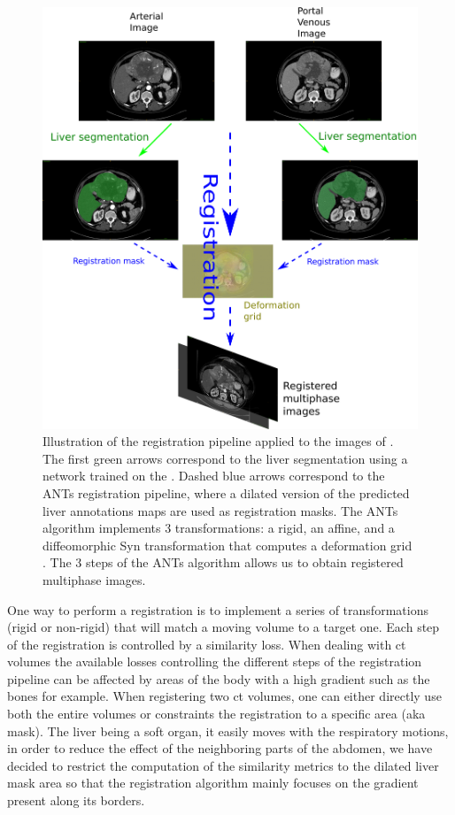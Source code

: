 \begin{figure}[th!]
\centering
\includegraphics[width=0.7\linewidth]{../HistologicalGradePrediction/images/ResizeRegistrationTCIA_pipeline_vertical2}
\caption{Illustration of the registration pipeline applied to the images of \textbf{}. The first green arrows correspond to the liver segmentation using a network trained on the \textbf{}. Dashed blue arrows correspond to the ANTs registration pipeline, where a dilated version of the predicted liver annotations maps are used as registration masks. The ANTs algorithm implements 3 transformations: a rigid, an affine, and a diffeomorphic Syn transformation that computes a deformation grid \cite{Avants2008}. The 3 steps of the ANTs algorithm allows us to obtain registered multiphase images.}
\label{fig:RegistrationTCIA_pipeline_vertical2}
\end{figure}


One way to perform a registration is to implement a series of
transformations (rigid or non-rigid) that will match a moving volume to
a target one. Each step of the registration is controlled by a
similarity loss.
When dealing with \ac{ct} volumes the available losses controlling the
different steps of the registration pipeline can be affected by areas of
the body with a high gradient such as the bones for example. When
registering two \ac{ct} volumes, one can either directly use both the entire
volumes or constraints the registration to a specific area (aka mask).
The liver being a soft organ, it easily moves with the respiratory
motions, in order to reduce the effect of the neighboring parts of the
abdomen, we have decided to restrict the computation of the similarity
metrics to the dilated liver mask area so that the registration
algorithm mainly focuses on the gradient present along its borders.

